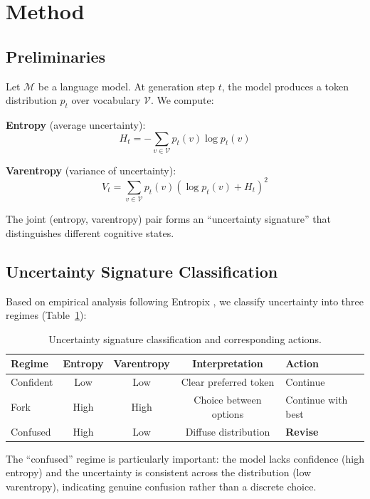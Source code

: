 \documentclass{article}
\begin{document}
\section{Method}
\label{sec:method}

\subsection{Preliminaries}

Let $\mathcal{M}$ be a language model. At generation step $t$, the model produces a token distribution $p_t$ over vocabulary $\mathcal{V}$. We compute:

\textbf{Entropy} (average uncertainty):
\begin{equation}
H_t = -\sum_{v \in \mathcal{V}} p_t(v) \log p_t(v)
\end{equation}

\textbf{Varentropy} (variance of uncertainty):
\begin{equation}
V_t = \sum_{v \in \mathcal{V}} p_t(v) \left(\log p_t(v) + H_t\right)^2
\end{equation}

The joint (entropy, varentropy) pair forms an ``uncertainty signature'' that distinguishes different cognitive states.

\subsection{Uncertainty Signature Classification}

Based on empirical analysis following Entropix \citep{xjdr2024entropix}, we classify uncertainty into three regimes (Table~\ref{tab:regimes}):

\begin{table}[t]
\caption{Uncertainty signature classification and corresponding actions.}
\label{tab:regimes}
\centering
\begin{tabular}{lcccp{3cm}}
\toprule
Regime & Entropy & Varentropy & Interpretation & Action \\
\midrule
Confident & Low & Low & Clear preferred token & Continue \\
Fork & High & High & Choice between options & Continue with best \\
Confused & High & Low & Diffuse distribution & \textbf{Revise} \\
\bottomrule
\end{tabular}
\end{table}

The ``confused'' regime is particularly important: the model lacks confidence (high entropy) and the uncertainty is consistent across the distribution (low varentropy), indicating genuine confusion rather than a discrete choice.
\end{document}
